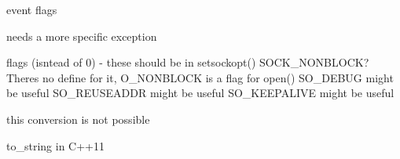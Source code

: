 
\begin{DoxyRefList}
\item[Member \mbox{\hyperlink{classHttpServer_aeb54b6186a9e7a11c6b321589f9379e1}{Http\+Server\+::start}} ()]\label{todo__todo000003}%
%
event flags  
\item[Member \mbox{\hyperlink{main_8cpp_a0ddf1224851353fc92bfbff6f499fa97}{main}} (int argc, char $\ast$argv\mbox{[}\mbox{]})]\label{todo__todo000001}%
%
needs a more specific exception  
\item[Member \mbox{\hyperlink{classTcpSocket_a132aa72af141d611f8bad96ba585a79f}{Tcp\+Socket\+::Tcp\+Socket}} ()]\label{todo__todo000012}%
%
flags (isntead of 0) -\/ these should be in setsockopt() SOCK\+\_\+\+NONBLOCK? There\textquotesingle{}s no define for it, O\+\_\+\+NONBLOCK is a flag for open() SO\+\_\+\+DEBUG might be useful SO\+\_\+\+REUSEADDR might be useful SO\+\_\+\+KEEPALIVE might be useful  
\item[Member \mbox{\hyperlink{classTest_a99f2bbfac6c95612322b0f10e607ebe5}{Test\+::Test}} ()]\label{todo__todo000013}%
%
this conversion is not possible 

\label{todo__todo000014}%
%
to\+\_\+string in C++11 
\end{DoxyRefList}